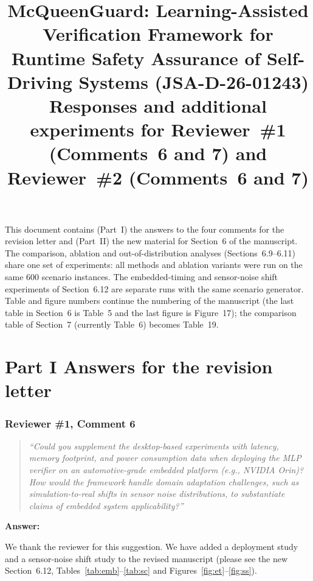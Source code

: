 \documentclass[11pt]{article}
\title{\vspace{-1.4cm}McQueenGuard: Learning-Assisted Verification Framework for Runtime Safety Assurance of Self-Driving Systems (JSA-D-26-01243)\\[4pt]
\large Responses and additional experiments for Reviewer~\#1 (Comments~6 and 7) and Reviewer~\#2 (Comments~6 and 7)}
\date{}
\newenvironment{revcomment}{\begin{quote}\itshape}{\end{quote}}
\newcommand{\answerhead}[1]{\par\medskip\noindent\textbf{#1}\par}
\begin{document}
\maketitle
\vspace{-1.3cm}
\noindent This document contains (Part~I) the answers to the four comments for the revision letter and (Part~II) the new
material for Section~6 of the manuscript. The comparison, ablation and out-of-distribution analyses (Sections~6.9--6.11) share one set of experiments: all methods
and ablation variants were run on the same 600 scenario instances. The embedded-timing and sensor-noise shift experiments of
Section~6.12 are separate runs with the same scenario generator.
Table and figure numbers continue the numbering of the manuscript (the last table in Section~6 is Table~5 and the last figure is
Figure~17); the comparison table of Section~7 (currently Table~6) becomes Table~19.

\tableofcontents

\part*{Part I \quad Answers for the revision letter}

\section*{Reviewer \#1, Comment 6}
\begin{revcomment}
``Could you supplement the desktop-based experiments with latency, memory footprint, and power consumption data when deploying
the MLP verifier on an automotive-grade embedded platform (e.g., NVIDIA Orin)? How would the framework handle domain adaptation
challenges, such as simulation-to-real shifts in sensor noise distributions, to substantiate claims of embedded system
applicability?''
\end{revcomment}
\answerhead{Answer:}
We thank the reviewer for this suggestion. We have added a deployment study and a sensor-noise shift study to the revised
manuscript (please see the new Section~6.12, Tables~\ref{tab:emb}--\ref{tab:sc} and Figures~\ref{fig:et}--\ref{fig:ss}).
\end{document}
